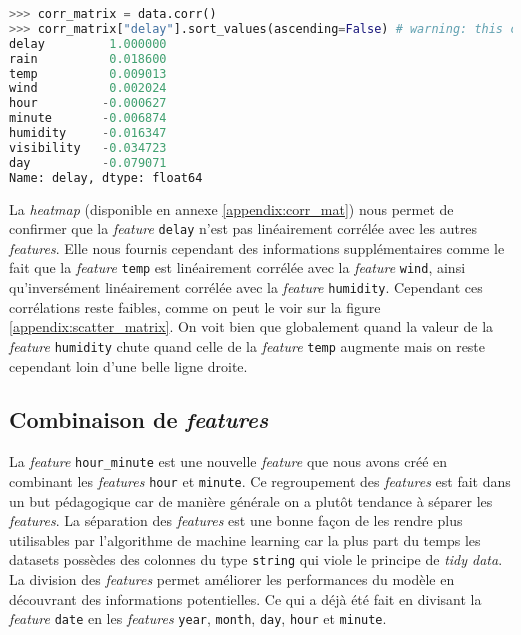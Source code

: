 \begin{lstlisting}[language=Python, caption=Coefficient standard de corrélation pour la \textit{feature} \lstinline!delay!., label=cscDelay]
>>> corr_matrix = data.corr()
>>> corr_matrix["delay"].sort_values(ascending=False) # warning: this check only linear correlation
delay         1.000000
rain          0.018600
temp          0.009013
wind          0.002024
hour         -0.000627
minute       -0.006874
humidity     -0.016347
visibility   -0.034723
day          -0.079071
Name: delay, dtype: float64
\end{lstlisting}

La \textit{heatmap} (disponible en annexe \ref{appendix:corr_mat}) nous permet de confirmer que la \textit{feature} \lstinline!delay! n'est pas linéairement corrélée avec les autres \textit{features}. Elle nous fournis cependant des informations supplémentaires comme le fait que la \textit{feature} \lstinline!temp! est linéairement corrélée avec la \textit{feature} \lstinline!wind!, ainsi qu'inversément linéairement corrélée avec la \textit{feature} \lstinline!humidity!. Cependant ces corrélations reste faibles, comme on peut le voir sur la figure \ref{appendix:scatter_matrix}. On voit bien que globalement quand la valeur de la \textit{feature} \lstinline!humidity! chute quand celle de la \textit{feature} \lstinline!temp! augmente mais on reste cependant loin d'une belle ligne droite.

\subsection{Combinaison de \textit{features}}
La \textit{feature} \lstinline!hour_minute! est une nouvelle \textit{feature} que nous avons créé en combinant les \textit{features} \lstinline!hour! et \lstinline!minute!. Ce regroupement des \textit{features} est fait dans un but pédagogique car de manière générale on a plutôt tendance à séparer les \textit{features}. La séparation des \textit{features} est une bonne façon de les rendre plus utilisables par l'algorithme de machine learning car la plus part du temps les datasets possèdes des colonnes du type \lstinline!string! qui viole le principe de \textit{tidy data}. La division des \textit{features} permet améliorer les performances du modèle en découvrant des informations potentielles. Ce qui a déjà été fait en divisant la \textit{feature} \lstinline!date! en les \textit{features} \lstinline!year!, \lstinline!month!, \lstinline!day!, \lstinline!hour! et \lstinline!minute!.

